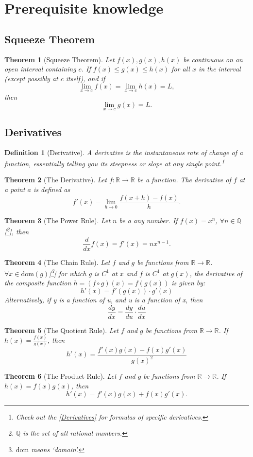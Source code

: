 \documentclass{article}
\newtheorem{theorem}{Theorem}
\newtheorem{definition}{Definition}
\begin{document}
\section{Prerequisite knowledge}
\subsection{Squeeze Theorem}
\begin{theorem}[Squeeze Theorem]
    Let \(f(x), g(x), h(x)\) be continuous on an open interval containing \(c\). If \(f(x) \leq g(x) \leq h(x)\) for all \(x\) in the interval (except possibly at \(c\) itself), and if
    \[\lim_{x \to c} f(x) = \lim_{x \to c} h(x) = L,\]
    then
    \[\lim_{x \to c} g(x) = L.\]
\end{theorem}

\subsection{Derivatives}
\begin{definition}[Derivative]
    A derivative is the instantaneous rate of change of a function, essentially telling you its steepness or slope at any single point.\footnote{Check out the \ref{Derivatives} for formulas of specific derivatives.}
\end{definition}
\begin{theorem}[The Derivative]
    Let \(f : \mathbb{R} \to \mathbb{R}\) be a function. The derivative of \(f\) at a point \(a\) is defined as
    \[f'(x) = \lim_{h \to 0} \frac{f(x+h) - f(x)}{h}.\]
\end{theorem}
\begin{theorem}[The Power Rule]
    Let \(n\) be a any number. If \(f(x) = x^n\), $\forall n \in \mathbb{Q}$\textup{[\footnote{$\mathbb{Q}$ is the set of all rational numbers.}]}, then
    \[\frac{d}{dx}f(x) = f'(x) = nx^{n - 1}.\]
\end{theorem}
\begin{theorem}[The Chain Rule]
    Let \(f\) and \(g\) be functions from \(\mathbb{R} \to \mathbb{R}\). \(\forall x \in \mathrm{dom}(g)\)\textup{[\footnote{$\mathrm{dom}$ means `domain'.}]} for which \(g\) is \(C^1\) at \(x\) and \(f\) is \(C^1\) at \(g(x)\), the derivative of the composite function \(
    h = (f \circ g)(x) = f(g(x))\) is given by: \[h'(x) = f'(g(x))\cdot g'(x)\] Alternatively, if y is a function of u, and u is a function of x, then \[\frac{dy}{dx} = \frac{dy}{du} \cdot \frac{du}{dx}\]
\end{theorem}
\begin{theorem}[The Quotient Rule]
    Let \(f\) and \(g\) be functions from \(\mathbb{R} \to \mathbb{R}\). If \(h(x) = \frac{f(x)}{g(x)}\), then
    \[h'(x) = \frac{f'(x)g(x) - f(x)g'(x)}{g(x)^2}\]
\end{theorem}
\begin{theorem}[The Product Rule]
    Let \(f\) and \(g\) be functions from \(\mathbb{R} \to \mathbb{R}\). If \(h(x) = f(x)g(x)\), then
    \[h'(x) = f'(x)g(x) + f(x)g'(x).\]
\end{theorem}
\end{document}
